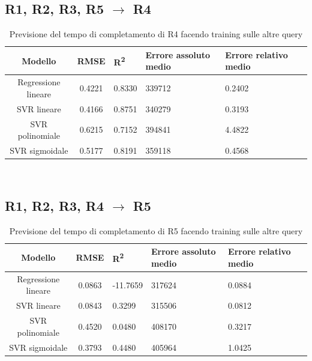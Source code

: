 \documentclass[a4paper,11pt]{article}
\begin{document}
\subsection{R1, R2, R3, R5 $\rightarrow$ R4}
\begin{table}[H]
	\centering
	\begin{adjustbox}{center}
		\begin{tabular}{c | c M{1.2cm} M{2.5cm} M{2.5cm} M{1.8cm}}
			Modello & RMSE & R\textsuperscript{2} & Errore assoluto medio & Errore relativo medio \tabularnewline
			\hline
			Regressione lineare & 0.4221 & 0.8330 & 339712 & 0.2402 \\
			SVR lineare & 0.4166 & 0.8751 & 340279 & 0.3193 \\
			SVR polinomiale & 0.6215 & 0.7152 & 394841 & 4.4822 \\
			SVR sigmoidale & 0.5177 & 0.8191 & 359118 & 0.4568 \\
		\end{tabular}
	\end{adjustbox}
	\\
	\caption{Previsione del tempo di completamento di R4 facendo training sulle altre query}
	\label{table_R4_prediction_all}
\end{table}

\subsection{R1, R2, R3, R4 $\rightarrow$ R5}
\begin{table}[H]
	\centering
	\begin{adjustbox}{center}
		\begin{tabular}{c | c M{1.4cm} M{2.5cm} M{2.5cm} M{1.8cm}}
			Modello & RMSE & R\textsuperscript{2} & Errore assoluto medio & Errore relativo medio \tabularnewline
			\hline
			Regressione lineare & 0.0863 & -11.7659 & 317624 & 0.0884 \\
			SVR lineare & 0.0843 & 0.3299 & 315506 & 0.0812 \\
			SVR polinomiale & 0.4520 & 0.0480 & 408170 & 0.3217 \\
			SVR sigmoidale & 0.3793 & 0.4480 & 405964 & 1.0425 \\
		\end{tabular}
	\end{adjustbox}
	\\
	\caption{Previsione del tempo di completamento di R5 facendo training sulle altre query}
	\label{table_R5_prediction_all}
\end{table}
\end{document}
